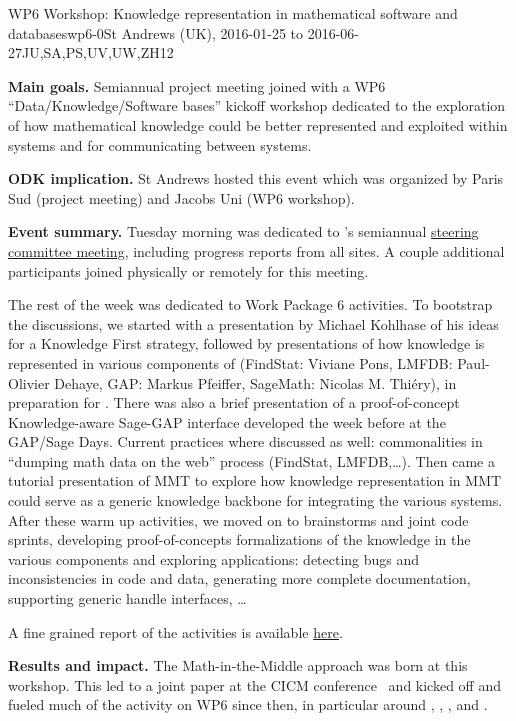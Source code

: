 \begin{event}{WP6 Workshop: Knowledge representation in mathematical software and databases}{wp6-0}{St Andrews (UK), 2016-01-25 to 2016-06-27}{JU,SA,PS,UV,UW,ZH}{12}{}

  \textbf{Main goals.} Semiannual \ODK project meeting joined with a
  WP6 ``Data/Knowledge/Software bases'' kickoff workshop dedicated to
  the exploration of how mathematical knowledge could be better
  represented and exploited within systems and for communicating
  between systems.


\textbf{ODK implication.} St Andrews hosted this event which was
organized by Paris Sud (project meeting) and Jacobs Uni (WP6 workshop).

\textbf{Event summary.} Tuesday morning was dedicated to \ODK's
semiannual
\href{http://opendreamkit.org/meetings/2016-01-25-DKS/SteeringCommittee/minutes/}
{steering committee meeting}, including progress reports from all
sites. A couple additional \ODK participants joined physically or
remotely for this meeting.

The rest of the week was dedicated to Work Package 6 activities. To
bootstrap the discussions, we started with a presentation by Michael
Kohlhase of his ideas for a Knowledge First strategy, followed by
presentations of how knowledge is represented in various components of
\ODK (FindStat: Viviane Pons, LMFDB: Paul-Olivier Dehaye, GAP: Markus
Pfeiffer, SageMath: Nicolas M. Thiéry), in preparation for
. There was also a brief presentation
of a proof-of-concept Knowledge-aware Sage-GAP interface developed the
week before at the GAP/Sage Days. Current practices where discussed as
well: commonalities in ``dumping math data on the web'' process
(FindStat, LMFDB,…). Then came a tutorial presentation of MMT to
explore how knowledge representation in MMT could serve as a generic
knowledge backbone for integrating the various systems.  After these
warm up activities, we moved on to brainstorms and joint code sprints,
developing proof-of-concepts formalizations of the knowledge in the
various components and exploring applications: detecting bugs and
inconsistencies in code and data, generating more complete
documentation, supporting generic handle interfaces, \ldots

A fine grained report of the activities is available
\href{http://opendreamkit.org/meetings/2016-01-25-DKS/report/}{here}.

\textbf{Results and impact.} The Math-in-the-Middle approach was born
at this workshop. This led to a joint paper at the CICM
conference~\cite{DehKohKon:iop16} and kicked off and fueled much of
the activity on WP6 since then, in particular around
, ,
, and
.


\end{event}
